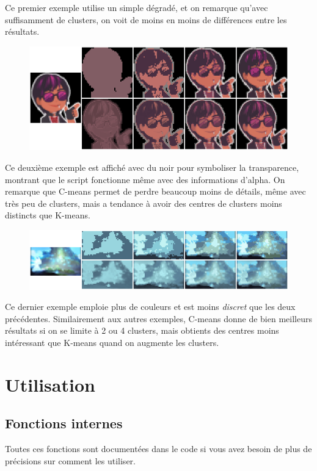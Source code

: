 \documentclass{article}
\begin{document}
  Ce premier exemple utilise un simple dégradé, et on remarque qu'avec suffisamment de clusters, on voit de moins en moins de différences entre les résultats.

  \begin{figure}[h]
    \centering
    \includegraphics[width=\textwidth]{images/concat_boss.png}
  \end{figure}

  \newpage
  Ce deuxième exemple est affiché avec du noir pour symboliser la transparence, montrant que le script fonctionne même avec des informations d'alpha. On remarque que C-means permet de perdre beaucoup moins de détails, même avec très peu de clusters, mais a tendance à avoir des centres de clusters moins distincts que K-means.

  \begin{figure}[h]
    \centering
    \includegraphics[width=\textwidth]{images/concat_test.png}
  \end{figure}

  Ce dernier exemple emploie plus de couleurs et est moins \textit{discret} que les deux précédentes. Similairement aux autres exemples, C-means donne de bien meilleurs résultats si on se limite à 2 ou 4 clusters, mais obtients des centres moins intéressant que K-means quand on augmente les clusters.

  \newpage
  \section{Utilisation}
    \subsection{Fonctions internes}
      Toutes ces fonctions sont documentées dans le code si vous avez besoin de plus de précisions sur comment les utiliser.
\end{document}
